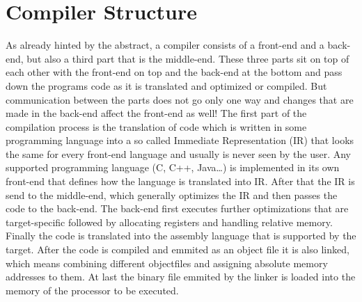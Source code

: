 \chapter{Compiler Structure}
\label{chapter:compiler structure}

As already hinted by the abstract, a compiler consists of a front-end and a back-end, but also a third part that is the middle-end. These three parts sit on top of each other with the front-end on top and the back-end at the bottom and pass down the programs code as it is translated and optimized or compiled. But communication between the parts does not go only one way and changes that are made in the back-end affect the front-end as well!
The first part of the compilation process is the translation of code which is written in some programming language into a so called Immediate Representation (IR) that looks the same for every front-end language and usually is never seen by the user. Any supported programming language (C, C++, Java…) is implemented in its own front-end that defines how the language is translated into IR. After that the IR is send to the middle-end, which generally optimizes the IR and then passes the code to the back-end. The back-end first executes further optimizations that are target-specific followed by allocating registers and handling relative memory. Finally the code is translated into the assembly language that is supported by the target.
After the code is compiled and emmited as an object file it is also linked, which means combining different objectfiles and assigning absolute memory addresses to them. At last the binary file emmited by the linker is loaded into the memory of the processor to be executed.
